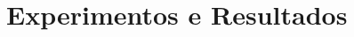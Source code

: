\documentclass[xcolor=dvipsnames]{beamer}
\begin{document}
    
    
        


\section{Experimentos e Resultados}
\end{document}
